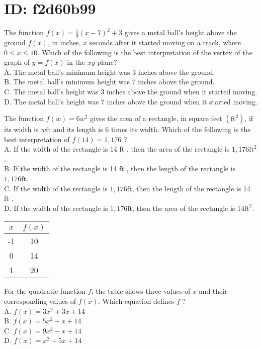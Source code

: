 \section*{ID: f2d60b99}
The function $f(x)=\frac{1}{9}(x-7)^{2}+3$ gives a metal ball's height above the ground $f(x)$, in inches, $x$ seconds after it started moving on a track, where $0 \leq x \leq 10$. Which of the following is the best interpretation of the vertex of the graph of $y=f(x)$ in the $x y$-plane?\\
A. The metal ball's minimum height was 3 inches above the ground.\\
B. The metal ball's minimum height was 7 inches above the ground.\\
C. The metal ball's height was 3 inches above the ground when it started moving.\\
D. The metal ball's height was 7 inches above the ground when it started moving.

The function $f(w)=6 w^{2}$ gives the area of a rectangle, in square feet $\left(\mathrm{ft}^{2}\right)$, if its width is $w \mathrm{ft}$ and its length is 6 times its width. Which of the following is the best interpretation of $f(14)=1,176$ ?\\
A. If the width of the rectangle is 14 ft , then the area of the rectangle is $1,176 \mathrm{ft}^{2}$.\\
B. If the width of the rectangle is 14 ft , then the length of the rectangle is $1,176 \mathrm{ft}$.\\
C. If the width of the rectangle is $1,176 \mathrm{ft}$, then the length of the rectangle is 14 ft .\\
D. If the width of the rectangle is $1,176 \mathrm{ft}$, then the area of the rectangle is $14 \mathrm{ft}^{2}$.

\begin{center}
\begin{tabular}{|c|c|}
\hline
$x$ & $f(x)$ \\
\hline
-1 & 10 \\
\hline
0 & 14 \\
\hline
1 & 20 \\
\hline
\end{tabular}
\end{center}

For the quadratic function $f$, the table shows three values of $x$ and their corresponding values of $f(x)$. Which equation defines $f$ ?\\
A. $f(x)=3 x^{2}+3 x+14$\\
B. $f(x)=5 x^{2}+x+14$\\
C. $f(x)=9 x^{2}-x+14$\\
D. $f(x)=x^{2}+5 x+14$

